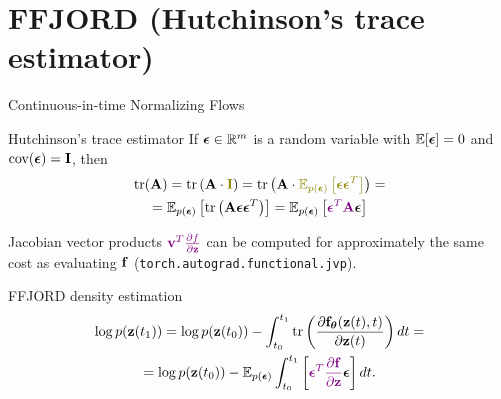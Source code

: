 \section{FFJORD (Hutchinson's trace estimator)}
\begin{frame}{Continuous-in-time Normalizing Flows}
	\begin{block}{Hutchinson's trace estimator}
		If $\boldsymbol{\epsilon} \in \mathbb{R}^m$ is a random variable with $\mathbb{E} [\boldsymbol{\epsilon}] = 0$ and $\text{cov} (\boldsymbol{\epsilon}) = \mathbf{I}$, then
		\vspace{-0.3cm}
		\begin{multline*}
		    \text{tr}(\mathbf{A}) = \text{tr}\left(\mathbf{A} \cdot {\color{olive}\bI} \right) = \text{tr}\left(\mathbf{A} \cdot {\color{olive}\mathbb{E}_{p(\bepsilon)} \left[ \bepsilon \bepsilon^T \right]} \right) = \\ 
		    =  \mathbb{E}_{p(\bepsilon)} \left[  \text{tr}\left(  \mathbf{A}  \bepsilon \bepsilon^T \right) \right] =  \mathbb{E}_{p(\bepsilon)} \left[ {\color{violet} \bepsilon^T \mathbf{A}} \bepsilon  \right]
		\end{multline*}
		\vspace{-0.6 cm}
	\end{block}
	Jacobian vector products ${\color{violet}\mathbf{v}^T \frac{\partial f}{\partial \mathbf{z}}}$ can be computed for approximately the same cost as evaluating $\mathbf{f}$ (\texttt{torch.autograd.functional.jvp}).
	\begin{block}{FFJORD density estimation}
		\vspace{-0.8cm}
		\begin{multline*}
		    \log p(\mathbf{z}(t_1)) = \log p(\mathbf{z}(t_0)) - \int_{t_0}^{t_1} \text{tr}  \left( \frac{\partial \mathbf{f}_{\boldsymbol{\theta}}(\mathbf{z}(t), t)}{\partial \mathbf{z}(t)} \right) dt = \\ = \log p(\mathbf{z}(t_0)) - \mathbb{E}_{p(\boldsymbol{\epsilon})} \int_{t_0}^{t_1} \left[ {\color{violet}\boldsymbol{\epsilon}^T \frac{\partial \mathbf{f}}{\partial \mathbf{z}}} \boldsymbol{\epsilon} \right] dt.
		\end{multline*}
	\end{block}
\end{frame}
